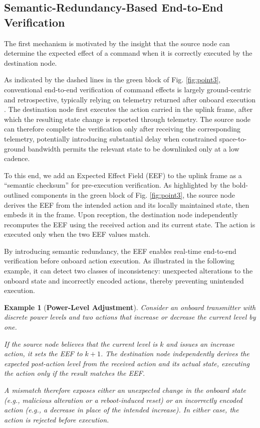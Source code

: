 \documentclass[journal]{IEEEtran}
\newtheorem{example}{Example}
\begin{document}
\subsection{Semantic-Redundancy-Based End-to-End Verification}
\label{subsection:ponit3-1sourceDestination}
The first mechanism is motivated by the insight that the source node can determine the expected effect of a command when it is correctly executed by the destination node. 


As indicated by the dashed lines in the green block of Fig. \ref{fig:point3}, conventional end-to-end verification of command effects is largely ground-centric and retrospective, typically relying on telemetry returned after onboard execution \cite{ecss7031c}. 
The destination node first executes the action carried in the uplink frame, after which the resulting state change is reported through telemetry. The source node can therefore complete the verification only after receiving the corresponding telemetry, potentially introducing substantial delay when constrained space-to-ground bandwidth permits the relevant state to be downlinked only at a low cadence. 

To this end, we add an Expected Effect Field (EEF) to the uplink frame as a ``semantic checksum'' for pre-execution verification. As highlighted by the bold-outlined components in the green block of Fig. \ref{fig:point3}, the source node derives the EEF from the intended action and its locally maintained state, then embeds it in the frame. Upon reception, the destination node independently recomputes the EEF using the received action and its current state. The action is executed only when the two EEF values match. 

By introducing semantic redundancy, the EEF enables real-time end-to-end verification before onboard action execution. 
As illustrated in the following example, it can detect two classes of inconsistency: unexpected alterations to the onboard state and incorrectly encoded actions, thereby preventing unintended execution.


\begin{example}[\textbf{Power-Level Adjustment}]
Consider an onboard transmitter with discrete power levels and two actions that increase or decrease the current level by one. 

If the source node believes that the current level is $k$ and issues an increase action, it sets the EEF to $k+1$.
The destination node independently derives the expected post-action level from the received action and its actual state, executing the action only if the result matches the EEF.

A mismatch therefore exposes either an unexpected change in the onboard state (e.g., malicious alteration or a reboot-induced reset) or an incorrectly encoded action (e.g., a decrease in place of the intended increase).
In either case, the action is rejected before execution.
\end{example}
\end{document}
